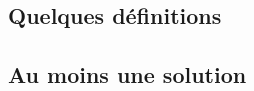 \documentclass[12pt]{amsart}
\begin{document}
\subsection{Quelques définitions}



\subsection{Au moins une solution}



%
%
%
%
\end{document}
